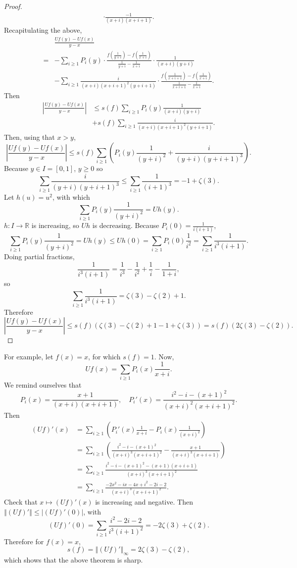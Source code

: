 \documentclass{article}
\newcommand{\norm}[1]{\left\Vert #1 \right\Vert}
\theoremstyle{definition}
\theoremstyle{definition}
\begin{document}
\begin{proof}
\[\begin{split}
\cdot \frac{-1}{(x+i)(x+i+1)}.
\end{split}
\]
Recapitulating the above,
\[
\begin{split}
&\frac{Uf(y)-Uf(x)}{y-x}\\
=&-\sum_{i \geq 1} P_i(y) \cdot \frac{f\left(\frac{1}{y+i}\right) - f\left(\frac{1}{x+i} \right)}{\frac{1}{y+i}-\frac{1}{x+i}}
\cdot \frac{1}{(x+i)(y+i)}\\
&-\sum_{i \geq 1} \frac{i}{(x+i)(x+i+1)^2 (y+i+1)} \cdot \frac{ f \left(\frac{1}{x+i+1}\right) - f \left( \frac{1}{x+i} \right)}{\frac{1}{x+i+1}-\frac{1}{x+i}}.
\end{split}
\]
Then
\begin{align*}
\left| \frac{Uf(y)-Uf(x)}{y-x} \right|&\leq s(f) \sum_{i \geq 1} P_i(y) \frac{1}{(x+i)(y+i)}\\
&+s(f) \sum_{i \geq 1}  \frac{i}{(x+i)(x+i+1)^2 (y+i+1)}.
\end{align*}
Then, using that $x>y$,
\[
\left| \frac{Uf(y)-Uf(x)}{y-x} \right| \leq s(f) \sum_{i \geq 1} \left( P_i(y) \frac{1}{(y+i)^2} + \frac{i}{(y+i)(y+i+1)^3} \right).
\]
Because $y \in I = [0,1]$, $y \geq 0$ so 
\[
\sum_{i \geq 1} \frac{i}{(y+i)(y+i+1)^3} \leq \sum_{i \geq 1} \frac{1}{(i+1)^3} = -1+\zeta(3).
\]
Let $h(u) = u^2$, with which
\[
\sum_{i \geq 1} P_i(y) \frac{1}{(y+i)^2} = Uh(y).
\]
$h:I \to \mathbb{R}$ is increasing, so $Uh$ is decreasing. 
Because $P_i(0) = \frac{1}{i(i+1)}$,
\[
\sum_{i \geq 1} P_i(y) \frac{1}{(y+i)^2} = Uh(y) \leq Uh(0) = \sum_{i \geq 1} P_i(0) \frac{1}{i^2}
=\sum_{i \geq 1} \frac{1}{i^3(i+1)}.
\]
Doing partial fractions, 
\[
\frac{1}{i^3(i+1)} = \frac{1}{i^3} - \frac{1}{i^2} + \frac{1}{i} - \frac{1}{1+i},
\]
so
\[
\sum_{i \geq 1} \frac{1}{i^3(i+1)} = \zeta(3) - \zeta(2) + 1.
\]
Therefore
\[
\left| \frac{Uf(y)-Uf(x)}{y-x} \right| \leq s(f)  \left(  \zeta(3) - \zeta(2) + 1 - 1 + \zeta(3) \right)
=s(f) (2\zeta(3)-\zeta(2)).
\]
\end{proof}

For example, let 
$f(x)=x$, for which $s(f)=1$. Now,
\[
Uf(x) = \sum_{i \geq 1} P_i(x) \frac{1}{x+i}.
\]
We remind ourselves that
\[
P_i(x) = \frac{x+1}{(x+i)(x+i+1)},\quad P_i'(x) =  \frac{i^2-i-(x+1)^2}{(x+i)^2(x+i+1)^2}.
\]
Then
\begin{align*}
(Uf)'(x)&=\sum_{i \geq 1} \left( P_i'(x) \frac{1}{x+i} - P_i(x) \frac{1}{(x+i)^2} \right)\\
&=\sum_{i \geq 1} \left( \frac{i^2-i-(x+1)^2}{(x+i)^3(x+i+1)^2} - \frac{x+1}{(x+i)^3(x+i+1)}\right)\\
&=\sum_{i \geq 1} \frac{i^2-i-(x+1)^2-(x+1)(x+i+1)}{(x+i)^3(x+i+1)^2}\\
&=\sum_{i \geq 1} \frac{-2x^2-ix-4x+i^2-2i-2}{(x+i)^3(x+i+1)^2}.
\end{align*}
Check that $x \mapsto (Uf)'(x)$ is increasing and negative. Then
$\norm{(Uf)'} \leq |(Uf)'(0)|$, with
\[
(Uf)'(0) = \sum_{i \geq 1} \frac{i^2-2i-2}{i^3(i+1)^2} = -2\zeta(3) + \zeta(2).
\]
Therefore for $f(x)=x$,
\[
s(f) = \norm{(Uf)'}_\infty = 2 \zeta(3)-\zeta(2),
\]
which shows that the above theorem is sharp.
\end{document}
